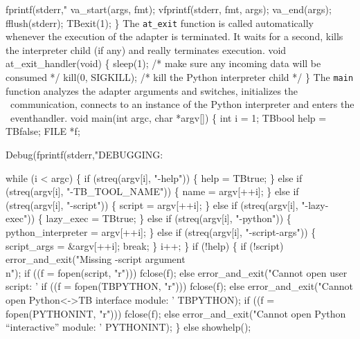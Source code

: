   fprintf(stderr,"%
  va_start(args, fmt);
  vfprintf(stderr, fmt, args);
  va_end(args);
  fflush(stderr);
  TBexit(1);
\}
\nwendcode{}\nwdocspar
The \texttt{at\_exit} function is called automatically whenever the
execution of the adapter is terminated. It waits for a second, kills
the interpreter child (if any) and really terminates execution.
\nwenddocs{}\plusendmoddef\nwstartdeflinemarkup{}\nwenddeflinemarkup
void at_exit_handler(void) \{
  sleep(1);             /* make sure any incoming data will be consumed */
  kill(0, SIGKILL);     /* kill the Python interpreter child */
\}
\nwendcode{}\nwdocspar
The \texttt{main} function analyzes the adapter arguments and
switches, initializes the \TB\ communication, connects to an instance
of the Python interpreter and enters the \TB\ eventhandler.
\nwenddocs{}\plusendmoddef\nwstartdeflinemarkup{}\nwenddeflinemarkup
void main(int argc, char *argv[]) \{
  int i = 1;
  TBbool help = TBfalse;
  FILE *f;

  Debug(fprintf(stderr,"DEBUGGING: %

  while (i < argc) \{
    if (streq(argv[i], "-help")) \{
      help = TBtrue;
    \} else if (streq(argv[i], "-TB_TOOL_NAME")) \{
      name = argv[++i];
    \} else if (streq(argv[i], "-script")) \{
      script = argv[++i];
    \} else if (streq(argv[i], "-lazy-exec")) \{
      lazy_exec = TBtrue;
    \} else if (streq(argv[i], "-python")) \{
      python_interpreter = argv[++i];
    \} else if (streq(argv[i], "-script-args")) \{
      script_args = &argv[++i];
      break;
    \} 
    i++;
  \}
  if (!help) \{
    if (!script) error_and_exit("Missing -script argument\\n");
    if ((f = fopen(script, "r"))) fclose(f);
    else error_and_exit("Cannot open user script: '%
    if ((f = fopen(TBPYTHON, "r"))) fclose(f);
    else error_and_exit("Cannot open Python<->TB interface module: '%
                        TBPYTHON);
    if ((f = fopen(PYTHONINT, "r"))) fclose(f);
    else error_and_exit("Cannot open Python ``interactive'' module: '%
                        PYTHONINT);
  \} else showhelp();

